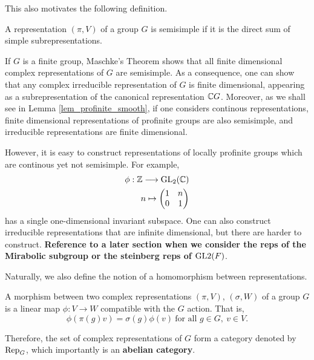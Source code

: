 This also motivates the following definition.

\begin{defn}
    A representation $(\pi,V)$ of a group $G$ is semisimple if it is the direct sum of simple subrepresentations. 
\end{defn}

\begin{rem}\label{rem_semisimple}
    If $G$ is a finite group, Maschke's Theorem shows that all finite dimensional complex representations of $G$ are semisimple. As a consequence, one can show that any complex irreducible representation of $G$ is finite dimensional, appearing as a subrepresentation of the canonical representation $\mathbb{C} G$.
    Moreover, as we shall see in Lemma \ref{lem_profinite_smooth}, if one considers continous representations, finite dimensional representations of profinite groups are also semisimple, and irreducible representations are finite dimensional.

    However, it is easy to construct representations of locally profinite groups which are continous yet not semisimple. For example,
    \begin{align*}
        \phi:\mathbb{Z}\longrightarrow \mathrm{GL}_2(\mathbb{C})\\
        n\mapsto 
        \begin{pmatrix}
            1 & n\\
            0 & 1\\
        \end{pmatrix}
    \end{align*}
    has a single one-dimensional invariant subspace. One can also construct irreducible representations that are infinite dimensional, but there are harder to construct. \textbf{Reference to a later section when we consider the reps of the Mirabolic subgroup or the steinberg reps of $\mathrm{GL}2(F)$}.
\end{rem}


Naturally, we also define the notion of a homomorphism between representations.

\begin{defn}
    A morphism between two complex representations $(\pi,V)$, $(\sigma,W)$ of a group $G$ is a linear map $\phi:V\rightarrow W$ compatible with the $G$ action. That is, 
    $$\phi(\pi(g)v)=\sigma(g)\phi(v)\ \text{for all } g\in G,\ v\in V.$$
\end{defn}

Therefore, the set of complex representations of $G$ form a category denoted by $\mathrm{Rep}_G$, which importantly is an \textbf{abelian category}.

